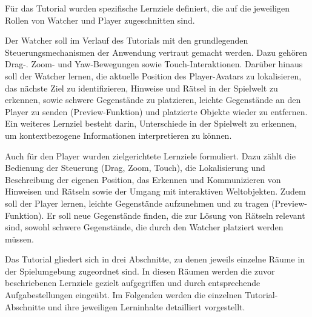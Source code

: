 Für das Tutorial wurden spezifische Lernziele definiert, die auf die jeweiligen Rollen von Watcher und Player zugeschnitten sind.

Der Watcher soll im Verlauf des Tutorials mit den grundlegenden Steuerungsmechanismen der Anwendung vertraut gemacht werden. Dazu gehören Drag-. Zoom- und Yaw-Bewegungen sowie Touch-Interaktionen. Darüber hinaus soll der Watcher lernen, die aktuelle Position des Player-Avatars zu lokalisieren, das nächste Ziel zu identifizieren, Hinweise und Rätsel in der Spielwelt zu erkennen, sowie schwere Gegenstände zu platzieren, leichte Gegenstände an den Player zu senden (Preview-Funktion) und platzierte Objekte wieder zu entfernen. Ein weiteres Lernziel besteht darin, Unterschiede in der Spielwelt zu erkennen, um kontextbezogene Informationen interpretieren zu können.

Auch für den Player wurden zielgerichtete Lernziele formuliert. Dazu zählt die Bedienung der Steuerung (Drag, Zoom, Touch), die Lokalisierung und Beschreibung der eigenen Position, das Erkennen und Kommunizieren von Hinweisen und Rätseln sowie der Umgang mit interaktiven Weltobjekten. Zudem soll der Player lernen, leichte Gegenstände aufzunehmen und zu tragen (Preview-Funktion). Er soll neue Gegenstände finden, die zur Lösung von Rätseln relevant sind, sowohl schwere Gegenstände, die durch den Watcher platziert werden müssen.

Das Tutorial gliedert sich in drei Abschnitte, zu denen jeweils einzelne Räume in der Spielumgebung zugeordnet sind. In diesen Räumen werden die zuvor beschriebenen Lernziele gezielt aufgegriffen und durch entsprechende Aufgabestellungen eingeübt. Im Folgenden werden die einzelnen Tutorial-Abschnitte und ihre jeweiligen Lerninhalte detailliert vorgestellt.


